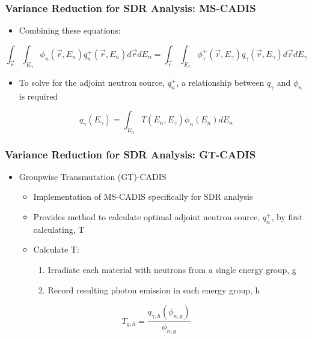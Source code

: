 \documentclass{beamer}
\begin{document}
\begin{frame}
\frametitle{Variance Reduction for SDR Analysis: MS-CADIS}
	\begin{itemize}
		\item{Combining these equations:}
	\end{itemize}
	\begin{centering}
	\begin{equation}
	\int_{\overrightarrow{r}} \int_{E_n} \phi_n(\overrightarrow{r}, E_n)
	q_n^+(\overrightarrow{r}, E_n) d\overrightarrow{r} dE_n =
		\int_{\overrightarrow{r}} \int_{E_{\gamma}} 
		\phi_{\gamma}^+(\overrightarrow{r}, E_{\gamma})
		q_{\gamma}(\overrightarrow{r}, E_{\gamma})
		d\overrightarrow{r} dE_{\gamma} 
	\end{equation}
	\end{centering}
	\begin{itemize}
		\item{To solve for the adjoint neutron source, $q_n^+$, a
			relationship between $q_{\gamma}$
			and $\phi_n$ is required}
	\end{itemize}
\centering
\begin{equation}
	q_{\gamma}(E_{\gamma}) = \int_{E_n} T(E_n, E_{\gamma}) \phi_n(E_n) dE_n
\end{equation}


\end{frame}
		
\begin{frame}
\frametitle{Variance Reduction for SDR Analysis: GT-CADIS}
\begin{itemize}
\item{Groupwise Transmutation (GT)-CADIS}
  \begin{itemize}
  \item{Implementation of MS-CADIS specifically for SDR analysis}
  \item{Provides method to calculate optimal adjoint neutron source, $q_n^+$,
	  by first calculating, T}
  \item{Calculate T:}
	  \begin{enumerate}
		  \item{Irradiate each material with neutrons from a single
			  energy group, g}
		  \item{Record resulting photon emission in each energy group,
			  h}
	  \end{enumerate}
  \end{itemize}

\end{itemize}
\centering
	\begin{equation}
		T_{g,h} = \frac{q_{\gamma,h}(\phi_{n,g})}{\phi_{n,g}}
	\end{equation}

\end{frame}
\end{document}
